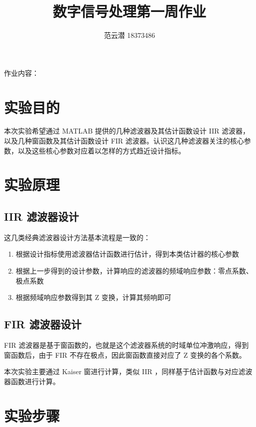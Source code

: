 \documentclass[lang=cn,11pt,a4paper,cite=authoryear]{elegantpaper}
\title{数字信号处理\quad 第一周作业}
\author{范云潜 18373486}
\institute{微电子学院 184111 班}
\date{\zhtoday}
\begin{document}
\maketitle

作业内容：

\tableofcontents




\section{实验目的}

本次实验希望通过 MATLAB 提供的几种滤波器及其估计函数设计 IIR 滤波器，以及几种窗函数及其估计函数设计 FIR 滤波器。认识这几种滤波器关注的核心参数，以及这些核心参数对应着以怎样的方式趋近设计指标。

\section{实验原理}

\subsection{IIR 滤波器设计}

这几类经典滤波器设计方法基本流程是一致的：

\begin{enumerate}
    \item 根据设计指标使用滤波器估计函数进行估计，得到本类估计器的核心参数
    \item 根据上一步得到的设计参数，计算响应的滤波器的频域响应参数：零点系数、极点系数
    \item 根据频域响应参数得到其 Z 变换，计算其频响即可
\end{enumerate}


\subsection{FIR 滤波器设计}

FIR 滤波器是基于窗函数的，也就是这个滤波器系统的时域单位冲激响应，得到窗函数后，由于 FIR 不存在极点，因此窗函数直接对应了 Z 变换的各个系数。

本次实验主要通过 Kaiser 窗进行计算，类似 IIR ，同样基于估计函数与对应滤波器函数进行计算。

\section{实验步骤}
\end{document}
